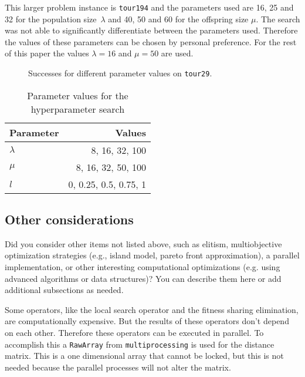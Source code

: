 \documentclass[a4paper,10pt]{article}
\newcommand{\ReplaceMe}[1]{{\color{blue}#1}}
\begin{document}
This larger problem instance is \texttt{tour194} and the parameters used are 16, 25 and 32 for the population size~$\lambda$ and 40, 50 and 60 for the offspring size $\mu$. The search was not able to significantly differentiate between the parameters used. Therefore the values of these parameters can be chosen by personal preference. For the rest of this paper the values $\lambda = 16$ and $\mu = 50$ are used.

\begin{figure}
\centering
\scalebox{.6}{}
\caption{Successes for different parameter values on \texttt{tour29}.}
\label{fig:hyperparameter}
\end{figure}

\begin{table}[]
\centering
\caption{Parameter values for the hyperparameter search}
\label{table:hyperparameter}
\begin{tabular}{|l|r|}
\hline
\rowcolor[HTML]{C0C0C0} 
Parameter & Values                       \\ \hline
$\lambda$ & 8, 16, 32, 100               \\ \hline
$\mu$     & 8, 16, 32, 50, 100      \\ \hline
$l$       & 0, 0.25, 0.5, 0.75, 1   \\ \hline
\end{tabular}
\end{table}

\subsection{Other considerations} \label{sec:other}

\ReplaceMe{Did you consider other items not listed above, such as elitism, multiobjective optimization strategies (e.g., island model, pareto front approximation), a parallel implementation, or other interesting computational optimizations (e.g. using advanced algorithms or data structures)? You can describe them here or add additional subsections as needed.}

Some operators, like the local search operator and the fitness sharing elimination, are computationally expensive. But the results of these operators don't depend on each other. Therefore these operators can be executed in parallel. To accomplish this a \texttt{RawArray} from \texttt{multiprocessing} is used for the distance matrix. This is a one dimensional array that cannot be locked, but this is not needed because the parallel processes will not alter the matrix.\\
\end{document}
